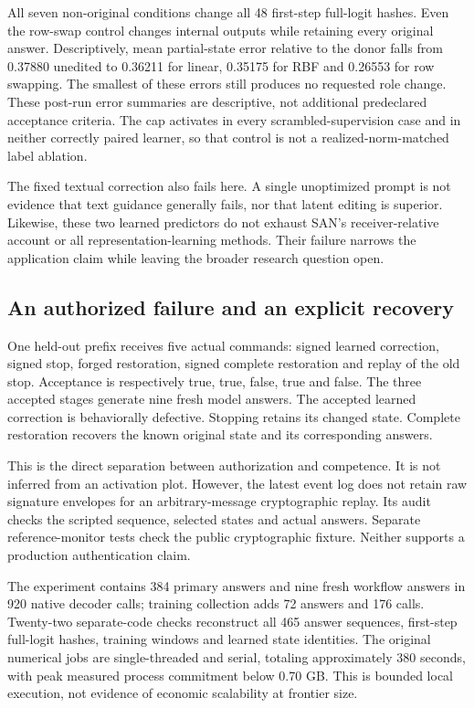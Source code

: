 \documentclass[11pt,letterpaper]{article}
\begin{document}
All seven non-original conditions change all 48 first-step full-logit hashes. Even the row-swap control changes internal outputs while retaining every original answer. Descriptively, mean partial-state error relative to the donor falls from 0.37880 unedited to 0.36211 for linear, 0.35175 for RBF and 0.26553 for row swapping. The smallest of these errors still produces no requested role change. These post-run error summaries are descriptive, not additional predeclared acceptance criteria. The cap activates in every scrambled-supervision case and in neither correctly paired learner, so that control is not a realized-norm-matched label ablation.

The fixed textual correction also fails here. A single unoptimized prompt is not evidence that text guidance generally fails, nor that latent editing is superior. Likewise, these two learned predictors do not exhaust SAN's receiver-relative account or all representation-learning methods. Their failure narrows the application claim while leaving the broader research question open.

\subsection{An authorized failure and an explicit recovery}

One held-out prefix receives five actual commands: signed learned correction, signed stop, forged restoration, signed complete restoration and replay of the old stop. Acceptance is respectively true, true, false, true and false. The three accepted stages generate nine fresh model answers. The accepted learned correction is behaviorally defective. Stopping retains its changed state. Complete restoration recovers the known original state and its corresponding answers.

This is the direct separation between authorization and competence. It is not inferred from an activation plot. However, the latest event log does not retain raw signature envelopes for an arbitrary-message cryptographic replay. Its audit checks the scripted sequence, selected states and actual answers. Separate reference-monitor tests check the public cryptographic fixture. Neither supports a production authentication claim.

The experiment contains 384 primary answers and nine fresh workflow answers in 920 native decoder calls; training collection adds 72 answers and 176 calls. Twenty-two separate-code checks reconstruct all 465 answer sequences, first-step full-logit hashes, training windows and learned state identities. The original numerical jobs are single-threaded and serial, totaling approximately 380 seconds, with peak measured process commitment below 0.70 GB. This is bounded local execution, not evidence of economic scalability at frontier size.
\end{document}
